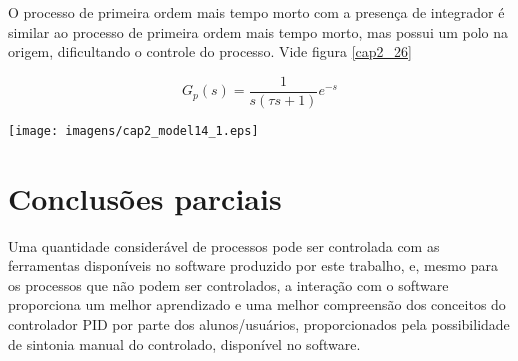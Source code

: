     O processo de primeira ordem mais tempo morto com a presença de integrador é
    similar ao processo de primeira ordem mais tempo morto, mas possui um polo
    na origem, dificultando o controle do processo. Vide figura \ref{cap2_26}
    
    \begin{equation}
        G_p(s) = \frac{1}{s(\tau s + 1)}e^{-s}
    \end{equation}
    
    \begin{center}
        \texttt{[image: imagens/cap2\_model14\_1.eps]}
        \label{cap2_26}
    \end{center}

\section{Conclusões parciais}

    Uma quantidade considerável de processos pode ser controlada com as ferramentas
    disponíveis no software produzido por este trabalho, e, mesmo para os processos
    que não podem ser controlados, a interação com o software proporciona um melhor
    aprendizado e uma melhor compreensão dos conceitos do controlador \ac{PID}
    por parte dos alunos/usuários, proporcionados pela possibilidade de sintonia
    manual do controlado, disponível no software.
